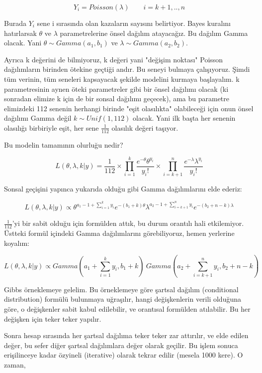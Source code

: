 \documentclass[12pt,fleqn]{article}\usepackage{../../common}
\begin{document}
$$ Y_i = Poisson(\lambda) \qquad i=k+1,..,n $$

Burada $Y_i$ sene i sırasında olan kazaların sayısını belirtiyor. Bayes kuralını
hatırlarsak $\theta$ ve $\lambda$ parametrelerine önsel dağılım atayacağız. Bu
dağılım Gamma olacak. Yani $\theta \sim Gamma(a_1, b_1)$ ve $\lambda \sim
Gamma(a_2, b_2)$.

Ayrıca k değerini de bilmiyoruz, k değeri yani "değişim noktası" Poisson
dağılımların birinden ötekine geçtiği andır. Bu seneyi bulmaya
çalışıyoruz. Şimdi tüm verinin, tüm seneleri kapsayacak şekilde modelini
kurmaya başlayalım. k parametresinin aynen öteki parametreler gibi bir
önsel dağılımı olacak (ki sonradan elimize k için de bir sonsal dağılımı
geçecek), ama bu parametre elimizdeki 112 senenin herhangi birinde "eşit
olasılıkta" olabileceği için onun önsel dağılımı Gamma değil $k \sim Unif(1,112)$ 
olacak. Yani ilk başta her senenin olasılığı birbiriyle eşit,
her sene $\frac{1}{112}$ olasılık değeri taşıyor.

Bu modelin tamamının olurluğu nedir?

$$ L(\theta, \lambda, k | y) = \frac{1}{112} \times \displaystyle \prod_{i=1}^k
\frac{e^{-\theta}\theta^{y_i}}{y_i!}  \times \displaystyle \prod_{i=k+1}^n
\frac{e^{-\lambda}\lambda^{y_i}}{y_i!} 
 $$

Sonsal geçişini yapınca yukarıda olduğu gibi Gamma dağılımlarını elde
ederiz:

$$ L(\theta, \lambda, k | y)  \propto 
\theta^{a_1-1+\sum_{i=1}^{k} y_i}e^{-(b_1+k)\theta} 
\lambda^{a_2-1+\sum_{i=k+1}^n y_i}e^{-(b_2+n-k)\lambda} 
 $$

$\frac{1}{112}$'yi bir sabit olduğu için formülden attık, bu durum orantılı hali
etkilemiyor. Üstteki formül içindeki Gamma dağılımlarını görebiliyoruz, hemen
yerlerine koyalım:

$$ L(\theta, \lambda, k | y)  \propto 
Gamma(a_1 + \sum_{i=1}^{k} y_i, b_1+k) \
Gamma(a_2 + \sum_{i=k+1}^{n} y_i, b_2+n-k)
 $$

Gibbs örneklemeye gelelim. Bu örneklemeye göre şartsal dağılım (conditional
distribution) formülü bulunmaya uğraşılır, hangi değişkenlerin verili olduğuna
göre, o değişkenler sabit kabul edilebilir, ve orantısal formülden
atılabilir. Bu her değişken için teker teker yapılır. 

Sonra hesap sırasında her şartsal dağılıma teker teker zar attırılır, ve
elde edilen değer, bu sefer diğer şartsal dağılımlara değer olarak
geçilir. Bu işlem sonuca erişilinceye kadar özyineli (iterative) olarak
tekrar edilir (mesela 1000 kere). O zaman,
\end{document}
